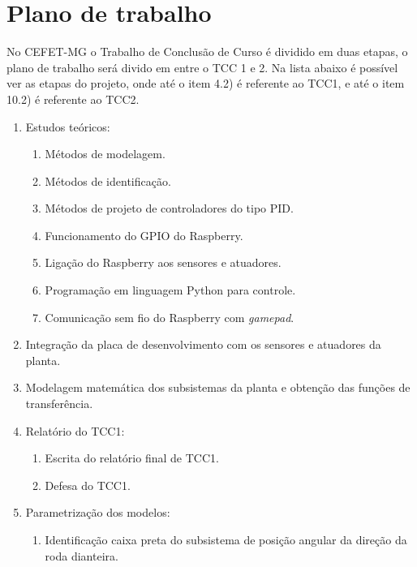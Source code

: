 \documentclass[conference,harvard,brazil,english]{sbatex}
\begin{document}
    \section{Plano de trabalho}
        
        No CEFET-MG o Trabalho de Conclusão de Curso é dividido em duas etapas, o plano de trabalho será divido em entre o TCC 1 e 2. Na lista abaixo é possível ver as etapas do projeto, onde até o item 4.2) é referente ao TCC1, e até o item 10.2) é referente ao TCC2.
        
        \begin{enumerate}[1.]
            \item Estudos teóricos: 
                \begin{enumerate}[1)]
                    \item Métodos de modelagem.
                    \item Métodos de identificação.
                    \item Métodos de projeto de controladores do tipo PID.
                    \item Funcionamento do GPIO do Raspberry.
                    \item Ligação do Raspberry aos sensores e atuadores.
                    \item Programação em linguagem Python para controle.
                    \item Comunicação sem fio do Raspberry com \textit{gamepad}.
                \end{enumerate}
            \item Integração da placa de desenvolvimento com os sensores e atuadores da planta.
            \item Modelagem matemática dos subsistemas da planta e obtenção das funções de transferência.
            \item Relatório do TCC1:
                \begin{enumerate}[1)]
                    \item Escrita do relatório final de TCC1.
                    \item Defesa do TCC1.
                \end{enumerate}
            \item Parametrização dos modelos:
                \begin{enumerate}[1)]
                    \item Identificação caixa preta do subsistema de posição angular da direção da roda dianteira.

\end{enumerate}
\end{enumerate}
\end{document}
